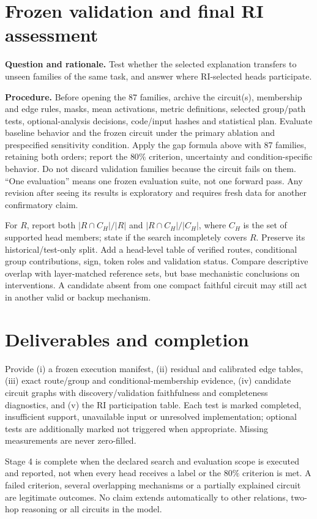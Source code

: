 \documentclass[11pt,a4paper]{article}
\newcommand{\purpose}{\textbf{Question and rationale.} }
\newcommand{\procedure}{\textbf{Procedure.} }
\begin{document}
\section{Frozen validation and final RI assessment}
\purpose Test whether the selected explanation transfers to unseen families
of the same task, and answer where RI-selected heads participate.

\procedure Before opening the 87 families, archive the circuit(s), membership
and edge rules, masks, mean activations, metric definitions, selected group/path
tests, optional-analysis decisions, code/input hashes and statistical plan.
Evaluate baseline behavior and the frozen circuit under the primary ablation
and prespecified sensitivity condition. Apply the gap formula above with 87
families, retaining both orders; report the $80\%$ criterion, uncertainty and
condition-specific behavior. Do not discard validation families because the
circuit fails on them. ``One evaluation'' means one frozen evaluation suite,
not one forward pass. Any revision after seeing its results is exploratory and
requires fresh data for another confirmatory claim.

For $R$, report both $|R\cap C_H|/|R|$ and $|R\cap C_H|/|C_H|$, where $C_H$
is the set of supported head members; state if the search incompletely covers
$R$. Preserve its historical/test-only split. Add a head-level table of verified
routes, conditional group contributions, sign, token roles and validation
status. Compare descriptive overlap with layer-matched reference sets, but
base mechanistic conclusions on interventions. A candidate absent from one
compact faithful circuit may still act in another valid or backup mechanism.

\section{Deliverables and completion}
Provide (i) a frozen execution manifest, (ii) residual and calibrated edge
tables, (iii) exact route/group and conditional-membership evidence,
(iv) candidate circuit graphs with discovery/validation faithfulness and
completeness diagnostics, and (v) the RI participation table. Each test is
marked completed, insufficient support, unavailable input or unresolved
implementation; optional tests are additionally marked not triggered when
appropriate. Missing measurements are never zero-filled.

Stage 4 is complete when the declared search and evaluation scope is executed
and reported, not when every head receives a label or the $80\%$ criterion is
met. A failed criterion, several overlapping mechanisms or a partially explained
circuit are legitimate outcomes. No claim extends automatically to other
relations, two-hop reasoning or all circuits in the model.
\end{document}
